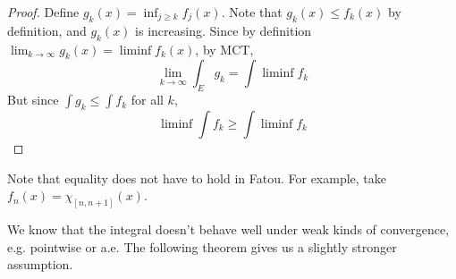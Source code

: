   \begin{proof}
    Define $g_k (x) = \inf_{j \geq k} f_j (x)$. Note that $g_k (x) \leq f_k (x)$ by definition, and $g_k (x)$ is increasing. Since by definition $\lim_{k \to \infty} g_k (x) = \liminf f_k (x)$, by MCT, 
    \begin{equation}
      \lim_{k \to \infty} \int_E g_k = \int \liminf f_k 
    \end{equation}
    But since $\int g_k \leq \int f_k$ for all $k$, 
    \begin{equation}
      \liminf \int f_k \geq \int \liminf f_k 
    \end{equation}
  \end{proof}

  \begin{example}
    \label{ex:strict-inequality-in-fatous-lemma}
    Note that equality does not have to hold in Fatou. For example, take $f_n (x) = \chi_{[n, n+1]} (x)$. 
  \end{example}

  We know that the integral doesn't behave well under weak kinds of convergence, e.g. pointwise or a.e. The following theorem gives us a slightly stronger assumption. 

